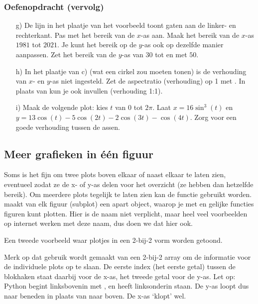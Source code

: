 \documentclass[a4paper,11pt, fleqn]{article}
\begin{document}
\subsubsection*{Oefenopdracht (vervolg)}
\begin{itemize}
	\item[g)] De lijn in het plaatje van het voorbeeld toont gaten aan de linker- en rechterkant. Pas met   het bereik van de $x$-as aan. Maak het bereik van de $x$-as $1981$ tot $2021$. Je kunt het bereik op de $y$-as ook op dezelfde manier aanpassen. Zet het bereik van de $y$-as van $30$ tot en met $50$.
	
	\item[h)] In het plaatje van c) (wat een cirkel zou moeten tonen) is de verhouding van $x$- en $y$-as niet ingesteld. Zet de aspectratio (verhouding) op 1 met . In plaats van  kun je ook  invullen (verhouding 1:1).
	
	\item[i)] Maak de volgende plot: kies $t$ van $0$ tot $2\pi$. Laat $x = 16 \sin^3(t)$ en $y = 13 \cos(t) - 5 \cos(2t) - 2 \cos(3t) - \cos(4t)$. Zorg voor een goede verhouding tussen de assen.
\end{itemize}

\subsection{Meer grafieken in \'e\'en figuur}
Soms is het fijn om twee plots boven elkaar of naast elkaar te laten zien, eventueel zodat ze de x- of y-as delen voor het overzicht (ze hebben dan hetzelfde bereik). Om meerdere plots tegelijk te laten zien kan de functie  gebruikt worden.  maakt van elk figuur (subplot) een apart object, waarop je met  en gelijke functies figuren kunt plotten. Hier is de naam  niet verplicht, maar heel veel voorbeelden op internet werken met deze naam, dus doen we dat hier ook.


Een tweede voorbeeld waar plotjes in een 2-bij-2 vorm worden getoond.


Merk op dat gebruik wordt gemaakt van een 2-bij-2 array om de informatie voor de individuele plots op te slaan. De eerste index (het eerste getal) tussen de blokhaken staat daarbij voor de x-as, het tweede getal voor de y-as. Let op: Python begint linksbovenin met \pythoninline{[0,0]}, en heeft \pythoninline{[0,1]} linksonderin staan. De y-as loopt dus naar beneden in plaats van naar boven. De x-as `klopt' wel.
\end{document}
